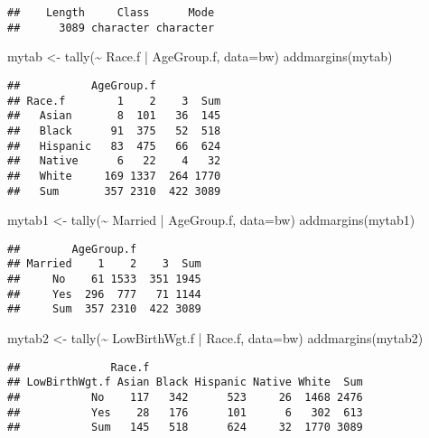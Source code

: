 \documentclass[
]{article}
\newenvironment{Shaded}{\begin{snugshade}}{\end{snugshade}}
\newcommand{\AttributeTok}[1]{\textcolor[rgb]{0.77,0.63,0.00}{#1}}
\newcommand{\FunctionTok}[1]{\textcolor[rgb]{0.00,0.00,0.00}{#1}}
\newcommand{\NormalTok}[1]{#1}
\newcommand{\OtherTok}[1]{\textcolor[rgb]{0.56,0.35,0.01}{#1}}
\newcommand{\SpecialCharTok}[1]{\textcolor[rgb]{0.00,0.00,0.00}{#1}}
\begin{document}
\begin{verbatim}
##    Length     Class      Mode 
##      3089 character character
\end{verbatim}

\begin{Shaded}
\begin{Highlighting}[]
\NormalTok{mytab }\OtherTok{\textless{}{-}} \FunctionTok{tally}\NormalTok{(}\SpecialCharTok{\textasciitilde{}}\NormalTok{ Race.f }\SpecialCharTok{|}\NormalTok{ AgeGroup.f, }\AttributeTok{data=}\NormalTok{bw)}
\FunctionTok{addmargins}\NormalTok{(mytab)}
\end{Highlighting}
\end{Shaded}

\begin{verbatim}
##           AgeGroup.f
## Race.f        1    2    3  Sum
##   Asian       8  101   36  145
##   Black      91  375   52  518
##   Hispanic   83  475   66  624
##   Native      6   22    4   32
##   White     169 1337  264 1770
##   Sum       357 2310  422 3089
\end{verbatim}

\begin{Shaded}
\begin{Highlighting}[]
\NormalTok{mytab1 }\OtherTok{\textless{}{-}} \FunctionTok{tally}\NormalTok{(}\SpecialCharTok{\textasciitilde{}}\NormalTok{ Married }\SpecialCharTok{|}\NormalTok{ AgeGroup.f, }\AttributeTok{data=}\NormalTok{bw)}
\FunctionTok{addmargins}\NormalTok{(mytab1)}
\end{Highlighting}
\end{Shaded}

\begin{verbatim}
##        AgeGroup.f
## Married    1    2    3  Sum
##     No    61 1533  351 1945
##     Yes  296  777   71 1144
##     Sum  357 2310  422 3089
\end{verbatim}

\begin{Shaded}
\begin{Highlighting}[]
\NormalTok{mytab2 }\OtherTok{\textless{}{-}} \FunctionTok{tally}\NormalTok{(}\SpecialCharTok{\textasciitilde{}}\NormalTok{ LowBirthWgt.f }\SpecialCharTok{|}\NormalTok{ Race.f, }\AttributeTok{data=}\NormalTok{bw)}
\FunctionTok{addmargins}\NormalTok{(mytab2)}
\end{Highlighting}
\end{Shaded}

\begin{verbatim}
##              Race.f
## LowBirthWgt.f Asian Black Hispanic Native White  Sum
##           No    117   342      523     26  1468 2476
##           Yes    28   176      101      6   302  613
##           Sum   145   518      624     32  1770 3089
\end{verbatim}
\end{document}
